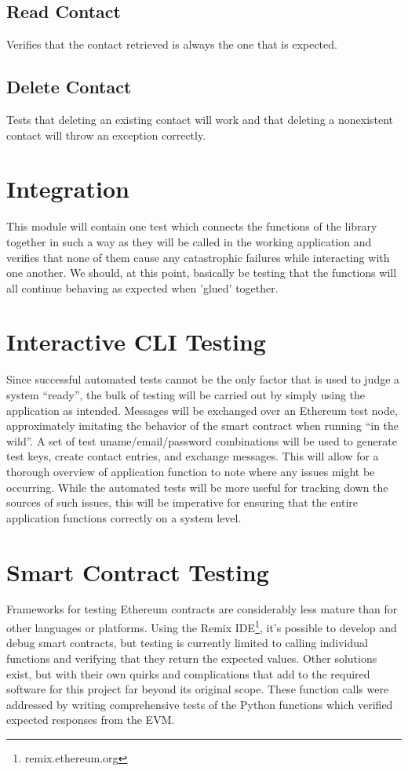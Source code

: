 \documentclass[titlepage]{report}
\begin{document}
\subsection{Read Contact}
Verifies that the contact retrieved is always the one that is expected.
\subsection{Delete Contact}
Tests that deleting an existing contact will work and that deleting a nonexistent contact will throw an exception correctly.

\section{Integration}
This module will contain one test which connects the functions of the library together in such a way as they will be called in the working application and verifies that none of them cause any catastrophic failures while interacting with one another. We should, at this point, basically be testing that the functions will all continue behaving as expected when 'glued' together.

\section{Interactive CLI Testing}
Since successful automated tests cannot be the only factor that is used to judge a system ``ready'', the bulk of testing will be carried out by simply using the application as intended. Messages will be exchanged over an \gls{Ethereum} test node, approximately imitating the behavior of the \gls{smart contract} when running ``in the wild''. A set of test uname/email/password combinations will be used to generate test keys, create contact entries, and exchange messages. This will allow for a thorough overview of application function to note where any issues might be occurring. While the automated tests will be more useful for tracking down the sources of such issues, this will be imperative for ensuring that the entire application functions correctly on a system level.

\section{Smart Contract Testing}
Frameworks for testing \gls{Ethereum} contracts are considerably less mature than for other languages or platforms. Using the Remix IDE\footnote{remix.ethereum.org}, it's possible to develop and debug \glspl{smart contract}, but testing is currently limited to calling individual functions and verifying that they return the expected values. Other solutions exist, but with their own quirks and complications that add to the required software for this project far beyond its original scope. These function calls were addressed by writing comprehensive tests of the Python functions which verified expected responses from the EVM.
\end{document}

